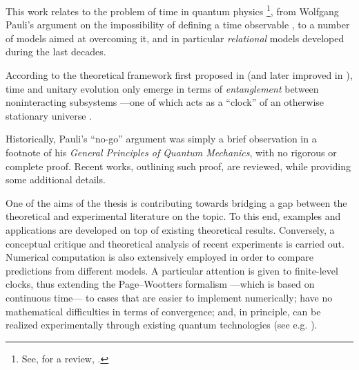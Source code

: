 This work relates to the problem of time in quantum physics%
\footnote{
  See, for a review, \cite{TQM1, TQM2}.
},
from Wolfgang Pauli's argument
on the impossibility of defining a time observable \parencite{PauliFootnote},
to a number of models aimed at overcoming it,
and in particular \emph{relational} models
developed during the last decades.

According to the theoretical framework first proposed in \cite{PageWootters}
(and later improved in \cite{Lloyd:Time}),
time and unitary evolution only emerge in
terms of \emph{entanglement} between noninteracting subsystems
---one of which acts as a ``clock''
of an otherwise stationary universe \parencite{Marletto:Evolution}.

Historically, Pauli's ``no-go'' argument was simply a brief observation in a footnote
of his \textit{General Principles of Quantum Mechanics},
with no rigorous or complete proof. Recent works, outlining such proof, are
reviewed, while providing some additional details.

One of the aims of the thesis
is contributing towards bridging a gap between the theoretical
and experimental literature on the topic.
To this end, examples and applications are developed on top of existing theoretical results.  
Conversely,
a conceptual critique and theoretical analysis
of recent experiments is carried out.
Numerical computation is also extensively employed in order to compare
predictions from different models. A particular attention is given
to finite-level clocks,
thus extending the Page--Wootters formalism ---which is based on continuous time---
to cases that are easier to implement numerically;
have no mathematical difficulties in terms of convergence;
and, in principle, can be realized experimentally through existing quantum technologies
(see e.g. \cite{FiniteHilb}). 